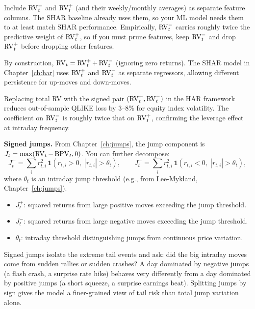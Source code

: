 \begin{projectconnection}
Include $\operatorname{RV}_t^-$ and $\operatorname{RV}_t^+$ (and their weekly/monthly averages) as separate feature columns. The SHAR baseline already uses them, so your ML model needs them to at least match SHAR performance. Empirically, $\operatorname{RV}_t^-$ carries roughly twice the predictive weight of $\operatorname{RV}_t^+$, so if you must prune features, keep $\operatorname{RV}_t^-$ and drop $\operatorname{RV}_t^+$ before dropping other features.
\end{projectconnection}

By construction, $\operatorname{RV}_t = \operatorname{RV}_t^+ + \operatorname{RV}_t^-$ (ignoring zero returns).
The SHAR model in Chapter~\ref{ch:har} uses $\operatorname{RV}_t^+$ and $\operatorname{RV}_t^-$ as separate regressors, allowing different persistence for up-moves and down-moves.

\begin{keyresult}
Replacing total RV with the signed pair $(\operatorname{RV}_t^+, \operatorname{RV}_t^-)$ in the HAR framework reduces out-of-sample QLIKE loss by 3--8\% for equity index volatility.
The coefficient on $\operatorname{RV}_t^-$ is roughly twice that on $\operatorname{RV}_t^+$, confirming the leverage effect at intraday frequency.
\end{keyresult}

\textbf{Signed jumps.}
From Chapter~\ref{ch:jumps}, the jump component is $J_t = \max(\operatorname{RV}_t - \operatorname{BPV}_t, 0)$.
You can further decompose:
\begin{equation}\label{eq:signed-jumps}
J_t^+ = \sum_{i} r_{t,i}^2 \,\mathbf{1}(r_{t,i} > 0,\; |r_{t,i}| > \theta_t), \qquad
J_t^- = \sum_{i} r_{t,i}^2 \,\mathbf{1}(r_{t,i} < 0,\; |r_{t,i}| > \theta_t),
\end{equation}
where $\theta_t$ is an intraday jump threshold (e.g., from Lee-Mykland, Chapter~\ref{ch:jumps}).
\begin{itemize}[nosep]
  \item $J_t^+$: squared returns from large positive moves exceeding the jump threshold.
  \item $J_t^-$: squared returns from large negative moves exceeding the jump threshold.
  \item $\theta_t$: intraday threshold distinguishing jumps from continuous price variation.
\end{itemize}

\begin{intuition}
Signed jumps isolate the extreme tail events and ask: did the big intraday moves come from sudden rallies or sudden crashes? A day dominated by negative jumps (a flash crash, a surprise rate hike) behaves very differently from a day dominated by positive jumps (a short squeeze, a surprise earnings beat). Splitting jumps by sign gives the model a finer-grained view of tail risk than total jump variation alone.
\end{intuition}

